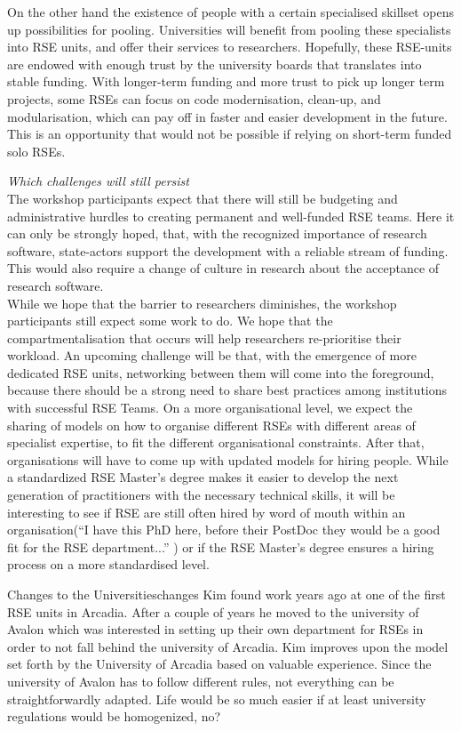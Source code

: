 \documentclass{eceasst}
\begin{document}
On the other hand the existence of people with a certain specialised skillset opens up possibilities for pooling.
Universities will benefit from pooling these specialists into RSE units, and offer their services to researchers.
Hopefully, these RSE-units are endowed with enough trust by the university boards that translates into stable funding.
With longer-term funding and more trust to pick up longer term projects,
some RSEs can focus on code modernisation, clean-up, and modularisation,
which can pay off in faster and easier development in the future.
This is an opportunity that would not be possible if relying on short-term funded solo RSEs.

\emph{Which challenges will still persist}\\
The workshop participants expect that there will still be budgeting and administrative hurdles to creating
permanent and well-funded RSE teams.
Here it can only be strongly hoped, that, with the recognized importance of research software, state-actors
support the development with a reliable stream of funding.
This would also require a change of culture in research about the acceptance of research software.\\
While we hope that the barrier to researchers diminishes, the workshop participants
still expect some work to do. We hope that the compartmentalisation that occurs will help researchers re-prioritise their workload.
An upcoming challenge will be that, with the emergence of more dedicated RSE units,
networking between them will come into the foreground, because there should be a strong need to share best practices
among institutions with successful RSE Teams.
On a more organisational level, we expect the sharing of models on how to organise different RSEs with different areas of specialist expertise, to fit the different organisational constraints.
After that, organisations will have to come up with updated models for hiring people.
While a standardized RSE Master's degree makes it easier to develop the next generation of practitioners with the necessary technical skills, it will be interesting to see if
RSE are still often hired by word of mouth within an organisation(``I have this PhD here, before their PostDoc they would be a good fit for the RSE department...'' ) or if the RSE Master's degree ensures a hiring process on a more standardised level.

\begin{story}{Changes to the Universities}{changes}
Kim found work years ago at one of the first RSE units in Arcadia. After a couple of years he moved to the university of
Avalon which was interested in setting up their own department for RSEs in order to not fall behind the university of Arcadia.
Kim improves upon the model set forth by the University of Arcadia based on valuable experience. Since the university
of Avalon has to follow different rules, not everything can be straightforwardly adapted. Life would be so much easier
if at least university regulations would be homogenized, no?
\end{story}
\end{document}
